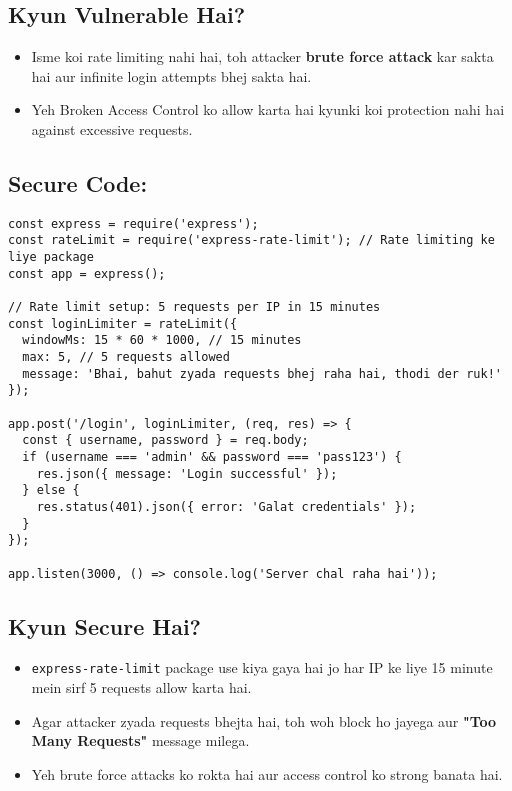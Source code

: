 \documentclass[a4paper, 12pt]{article}
\begin{document}
\subsection{Kyun Vulnerable Hai?}
\begin{itemize}
    \item Isme koi rate limiting nahi hai, toh attacker \textbf{\color{importantred}brute force attack} kar sakta hai aur infinite login attempts bhej sakta hai.
    \item Yeh Broken Access Control ko allow karta hai kyunki koi protection nahi hai against excessive requests.
\end{itemize}

\subsection{Secure Code:}
\begin{lstlisting}[caption={Secure Login with Rate Limiting}]
const express = require('express');
const rateLimit = require('express-rate-limit'); // Rate limiting ke liye package
const app = express();

// Rate limit setup: 5 requests per IP in 15 minutes
const loginLimiter = rateLimit({
  windowMs: 15 * 60 * 1000, // 15 minutes
  max: 5, // 5 requests allowed
  message: 'Bhai, bahut zyada requests bhej raha hai, thodi der ruk!'
});

app.post('/login', loginLimiter, (req, res) => {
  const { username, password } = req.body;
  if (username === 'admin' && password === 'pass123') {
    res.json({ message: 'Login successful' });
  } else {
    res.status(401).json({ error: 'Galat credentials' });
  }
});

app.listen(3000, () => console.log('Server chal raha hai'));
\end{lstlisting}

\subsection{Kyun Secure Hai?}
\begin{itemize}
    \item \texttt{express-rate-limit} package use kiya gaya hai jo har IP ke liye 15 minute mein sirf 5 requests allow karta hai.
    \item Agar attacker zyada requests bhejta hai, toh woh block ho jayega aur \textbf{\color{importantred}"Too Many Requests"} message milega.
    \item Yeh brute force attacks ko rokta hai aur access control ko strong banata hai.
\end{itemize}
\end{document}
